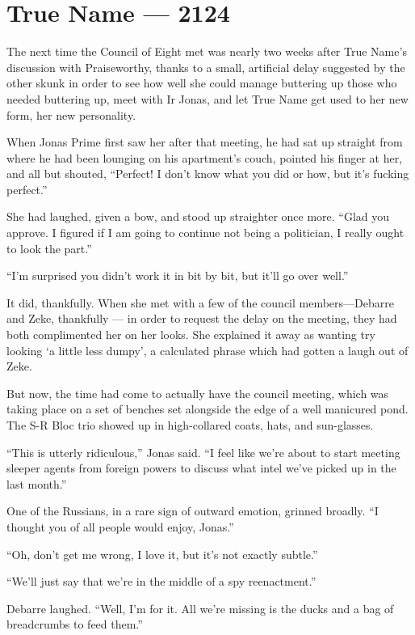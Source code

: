 \hypertarget{true-name-2124}{%
\chapter{True Name — 2124}\label{true-name-2124}}

The next time the Council of Eight met was nearly two weeks after True Name's discussion with Praiseworthy, thanks to a small, artificial delay suggested by the other skunk in order to see how well she could manage buttering up those who needed buttering up, meet with Ir Jonas, and let True Name get used to her new form, her new personality.

When Jonas Prime first saw her after that meeting, he had sat up straight from where he had been lounging on his apartment's couch, pointed his finger at her, and all but shouted, ``Perfect! I don't know what you did or how, but it's fucking perfect.''

She had laughed, given a bow, and stood up straighter once more. ``Glad you approve. I figured if I am going to continue not being a politician, I really ought to look the part.''

``I'm surprised you didn't work it in bit by bit, but it'll go over well.''

It did, thankfully. When she met with a few of the council members---Debarre and Zeke, thankfully — in order to request the delay on the meeting, they had both complimented her on her looks. She explained it away as wanting try looking `a little less dumpy', a calculated phrase which had gotten a laugh out of Zeke.

But now, the time had come to actually have the council meeting, which was taking place on a set of benches set alongside the edge of a well manicured pond. The S-R Bloc trio showed up in high-collared coats, hats, and sun-glasses.

``This is utterly ridiculous,'' Jonas said. ``I feel like we're about to start meeting sleeper agents from foreign powers to discuss what intel we've picked up in the last month.''

One of the Russians, in a rare sign of outward emotion, grinned broadly. ``I thought you of all people would enjoy, Jonas.''

``Oh, don't get me wrong, I love it, but it's not exactly subtle.''

``We'll just say that we're in the middle of a spy reenactment.''

Debarre laughed. ``Well, I'm for it. All we're missing is the ducks and a bag of breadcrumbs to feed them.''

